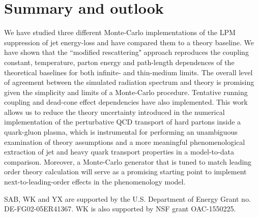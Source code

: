 \documentclass[aps, prc, reprint, amsmath, groupedaddress, nofootinbib]{revtex4-1}
\begin{document}
\section{Summary and outlook}\label{section:summary}


We have studied three different Monte-Carlo implementations of the LPM suppression of jet energy-loss and have compared them to a theory baseline.
We have shown that the ``modified rescattering" approach reproduces the coupling constant, temperature, parton energy and path-length dependences of the theoretical baselines for both infinite- and thin-medium limits.
The overall level of agreement between the simulated radiation spectrum and theory is promising given the simplicity and limits of a Monte-Carlo procedure. Tentative running coupling and dead-cone effect dependencies have also implemented.
This work allows us to reduce the theory uncertainty introduced in the numerical implementation of the perturbative QCD transport of hard partons inside a quark-gluon plasma, which is instrumental for performing an unambiguous examination of theory assumptions and a more meaningful phenomenological extraction of jet and heavy quark transport properties in a model-to-data comparison.
Moreover, a Monte-Carlo generator that is tuned to match leading order theory calculation will serve as a promising starting point to implement next-to-leading-order effects in the phenomenology model.


\begin{acknowledgments}
SAB, WK and YX are supported by the U.S. Department of Energy Grant no. DE-FG02-05ER41367. WK is also supported by NSF grant OAC-1550225.
\end{acknowledgments}
\end{document}
